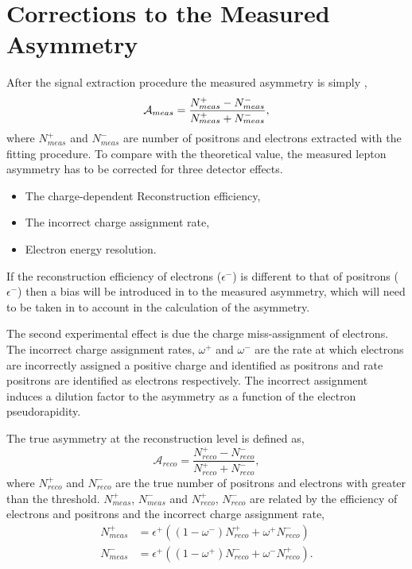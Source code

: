 \section{Corrections to the Measured Asymmetry}
After the signal extraction procedure the measured asymmetry is simply ,
\begin{equation}
\mathcal{A}_{meas} = \frac{
\label{eq:meas}
  N_{meas}^{+} -
  N_{meas}^{-}
}
{
  N_{meas}^{+} +
  N_{meas}^{-}
},
\end{equation}
where $N_{meas}^{+}$ and $N_{meas}^{-}$ are number of positrons and
electrons extracted with the fitting procedure.
To compare with the theoretical value, the measured lepton asymmetry has to be
corrected for three detector effects.
\begin{itemize}
\item The charge-dependent Reconstruction efficiency,
\item The incorrect charge assignment rate,
\item Electron energy resolution.
\end{itemize}

If the reconstruction efficiency of electrons ($\epsilon^-$) is different to
that of positrons ($\epsilon^-$) then a bias will be introduced in to the
measured asymmetry, which will need to be taken in to account in the calculation
of the asymmetry.  

The second experimental effect is due the charge miss-assignment of electrons.
The incorrect charge assignment rates, $\omega^+$ and $\omega^-$ are the rate at which electrons are
incorrectly assigned a positive charge and identified as positrons and rate positrons are
identified as electrons respectively.
The incorrect assignment induces a dilution factor to the asymmetry as a
function of the electron pseudorapidity. 

The true asymmetry at the reconstruction level is defined as,
\begin{equation}
\label{eq:reco}
\mathcal{A}_{reco} = \frac{
  N_{reco}^{+} -
  N_{reco}^{-}
}
{
  N_{reco}^{+} +
  N_{reco}^{-}
},
\end{equation}
where $N_{reco}^{+}$ and $N_{reco}^{-}$ are the true number of positrons and
electrons with \pT greater than the threshold. 
$N_{meas}^{+}$, $N_{meas}^{-}$ and 
$N_{reco}^{+}$, $N_{reco}^{-}$ are related by the efficiency of electrons and
positrons and the incorrect charge assignment rate,
\begin{align}
  \label{eq:poscor}
  N_{meas}^{+} 
  &= \epsilon^+ \left( ( 1 - \omega^- ) N_{reco}^{+} + \omega^+ N_{reco}^{-} \right)\\
  \label{eq:negcor}
  N_{meas}^{-} 
  &= \epsilon^+ \left( ( 1 - \omega^+ ) N_{reco}^{-} + \omega^- N_{reco}^{+} \right).
\end{align}

